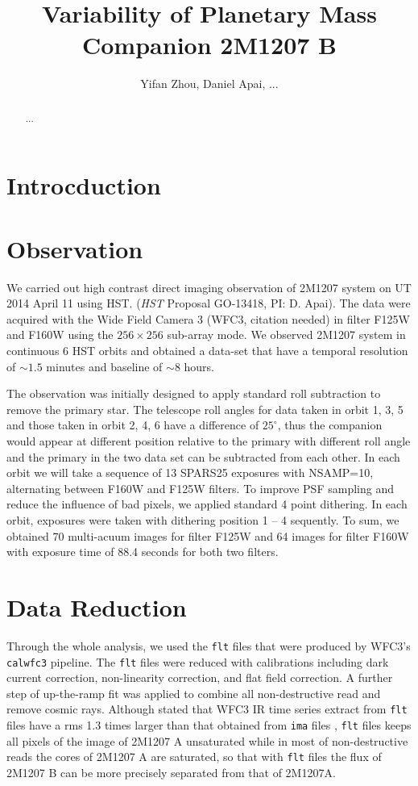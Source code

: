 \documentclass[apj]{emulateapj}
\newcommand{\ima}{\texttt{ima} files }
\newcommand{\flt}{\texttt{flt} files }
\begin{document}
\title{Variability of Planetary Mass Companion 2M1207 B}
\author{Yifan Zhou, Daniel Apai, ...}

\begin{abstract}
...
\end{abstract}

\maketitle
%
\section{Introcduction}

\section{Observation}
We carried out high contrast direct imaging observation of  2M1207
system on UT 2014 April 11 using HST.
(\textit{HST} Proposal GO-13418, PI: D. Apai). The data were acquired
with the Wide Field Camera 3 (WFC3, citation needed) in filter F125W
and F160W using the $256\times256$ sub-array mode. We observed
2M1207 system in continuous 6 HST orbits and obtained a data-set that
have a temporal resolution of $\sim1.5$ minutes and baseline of $\sim
8$ hours.


The observation was initially designed to apply standard roll
subtraction to remove the primary star. The telescope roll angles for
data taken in orbit 1, 3, 5 and those taken in orbit 2, 4, 6 have a
difference of $25^{\circ}$, thus the companion would appear at
different position relative to the primary with different roll angle
and the primary in the two data set can be subtracted from each other.
In each orbit we will take a sequence of 13 SPARS25 exposures with
NSAMP=10, alternating between F160W and F125W filters. To improve PSF
sampling and reduce the influence of bad pixels, we applied standard 4
point dithering. In each orbit, exposures were taken with dithering
position 1 -- 4 sequently. To sum, we obtained 70 multi-acuum images
for filter F125W and 64 images for filter F160W with exposure time of
88.4 seconds for both two filters.


\section{Data Reduction}

Through the whole analysis, we used the \flt that were
produced by WFC3's \texttt{calwfc3} pipeline. The \flt were reduced
with calibrations including dark current correction, non-linearity
correction, and flat field correction. A further step of up-the-ramp
fit was applied to combine all non-destructive read and remove cosmic
rays. Although \citeauthor{Mandell2013} stated that WFC3 IR time series
extract from {\flt} have a rms 1.3 times larger than that obtained
from {\ima}, \flt keeps all pixels of the image of 2M1207 A
unsaturated while in most of non-destructive reads the cores of 2M1207
A are saturated, so that with \flt the flux of 2M1207 B can be more
precisely separated from that of 2M1207A. 
\end{document}
